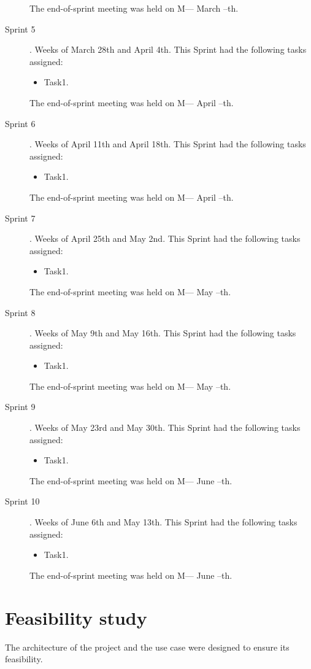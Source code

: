 \begin{description}
\begin{itemize}
	\end{itemize}
	The end-of-sprint meeting was held on M--- March --th.
	\item[Sprint 5]. Weeks of March 28th and April 4th. This Sprint had the following tasks assigned:
	\begin{itemize}
		\item Task1.
	\end{itemize}
	The end-of-sprint meeting was held on M--- April --th.
	\item[Sprint 6]. Weeks of April 11th and April 18th. This Sprint had the following tasks assigned:
	\begin{itemize}
		\item Task1.
	\end{itemize}
	The end-of-sprint meeting was held on M--- April --th.
	\item[Sprint 7]. Weeks of April 25th and May 2nd. This Sprint had the following tasks assigned:
	\begin{itemize}
		\item Task1.
	\end{itemize}
	The end-of-sprint meeting was held on M--- May --th.
	\item[Sprint 8]. Weeks of May 9th and May 16th. This Sprint had the following tasks assigned:
	\begin{itemize}
		\item Task1.
	\end{itemize}
	The end-of-sprint meeting was held on M--- May --th.
	\item[Sprint 9]. Weeks of May 23rd and May 30th. This Sprint had the following tasks assigned:
	\begin{itemize}
		\item Task1.
	\end{itemize}
	The end-of-sprint meeting was held on M--- June --th.
	\item[Sprint 10]. Weeks of June 6th and May 13th. This Sprint had the following tasks assigned:
	\begin{itemize}
		\item Task1.
	\end{itemize}
	The end-of-sprint meeting was held on M--- June --th.
\end{description}

\section{Feasibility study}
\nonzeroparskip The architecture of the project and the use case were designed to ensure its feasibility.


